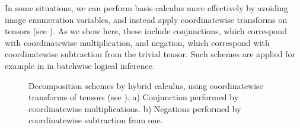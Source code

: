\label{sec:hybridCalculus}

In some situations, we can perform basis calculus more effectively by avoiding image enumeration variables, and instead apply coordinatewise transforms on tensors (see ).
As we show here, these include conjunctions, which correspond with coordinatewise multiplication, and negation, which correspond with coordinatewise subtraction from the trivial tensor.
Such schemes are applied for example in \cite{tsilionis_tensor-based_2024} in batchwise logical inference.

\begin{figure}
    \begin{center}
        
    \end{center}
    \caption{Decomposition schemes by hybrid calculus, using coordinatewise transforms of tensors (see ).
    a) Conjunction performed by coordinatewise multiplications.
    b) Negations performed by coordinatewise subtraction from one.}\label{fig:ConNegDecomposition}
\end{figure}

